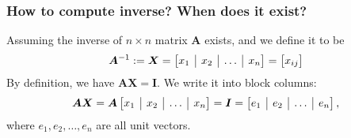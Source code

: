 \subsubsection{How to compute inverse? When does it exist?}
Assuming the inverse of $n\times n$ matrix $\bm A$ exists, and we define it to be
\[
\bm A^{-1}:=\bm X = \left[
\begin{array}{@{}c|c|c|c@{}}
x_1&x_2&\ldots&x_n
\end{array} \right] = \begin{bmatrix}
x_{ij}
\end{bmatrix}
\]
By definition, we have $\bm A\bm X = \bm I$. We write it into block columns:
\[
\bm A\bm X = \bm A\left[
\begin{array}{@{}c|c|c|c@{}}
x_1&x_2&\ldots&x_n
\end{array} \right]
=
\bm I = \left[
\begin{array}{@{}c|c|c|c@{}}
e_1&e_2&\ldots&e_n
\end{array} \right],
\]
where $e_1,e_2,\dots,e_n$ are all unit vectors.

